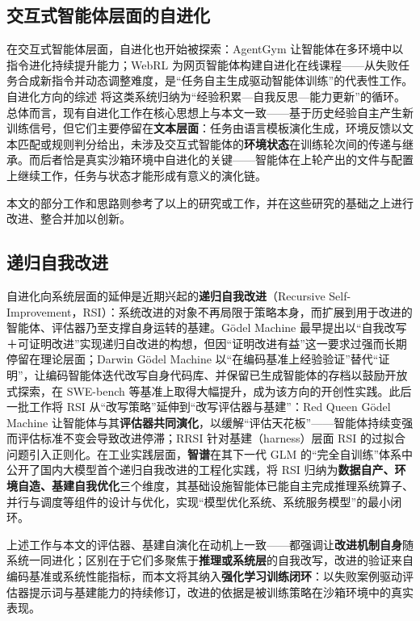\subsection{交互式智能体层面的自进化}

在交互式智能体层面，自进化也开始被探索：AgentGym 让智能体在多环境中以指令进化持续提升能力；WebRL 为网页智能体构建自进化在线课程——从失败任务合成新指令并动态调整难度，是“任务自主生成驱动智能体训练”的代表性工作。自进化方向的综述 将这类系统归纳为“经验积累—自我反思—能力更新”的循环。总体而言，现有自进化工作在核心思想上与本文一致——基于历史经验自主产生新训练信号，但它们主要停留在\textbf{文本层面}：任务由语言模板演化生成，环境反馈以文本匹配或规则判分给出，未涉及交互式智能体的\textbf{环境状态}在训练轮次间的传递与继承。而后者恰是真实沙箱环境中自进化的关键——智能体在上轮产出的文件与配置上继续工作，任务与状态才能形成有意义的演化链。

本文的部分工作和思路则参考了以上的研究或工作，并在这些研究的基础之上进行改进、整合并加以创新。

\subsection{递归自我改进}

自进化向系统层面的延伸是近期兴起的\textbf{递归自我改进}（Recursive Self-Improvement，RSI）：系统改进的对象不再局限于策略本身，而扩展到用于改进的智能体、评估器乃至支撑自身运转的基建。Gödel Machine 最早提出以“自我改写＋可证明改进”实现递归自改进的构想，但因“证明改进有益”这一要求过强而长期停留在理论层面；Darwin Gödel Machine 以“在编码基准上经验验证”替代“证明”，让编码智能体迭代改写自身代码库、并保留已生成智能体的存档以鼓励开放式探索，在 SWE-bench 等基准上取得大幅提升，成为该方向的开创性实践。此后一批工作将 RSI 从“改写策略”延伸到“改写评估器与基建”：Red Queen Gödel Machine 让智能体与其\textbf{评估器共同演化}，以缓解“评估天花板”——智能体持续变强而评估标准不变会导致改进停滞；RRSI 针对基建（harness）层面 RSI 的过拟合问题引入正则化。在工业实践层面，\textbf{智谱}在其下一代 GLM 的“完全自训练”体系中公开了国内大模型首个递归自我改进的工程化实践，将 RSI 归纳为\textbf{数据自产、环境自造、基建自我优化}三个维度，其基础设施智能体已能自主完成推理系统算子、并行与调度等组件的设计与优化，实现“模型优化系统、系统服务模型”的最小闭环。

上述工作与本文的评估器、基建自演化在动机上一致——都强调让\textbf{改进机制自身}随系统一同进化；区别在于它们多聚焦于\textbf{推理或系统层}的自我改写，改进的验证来自编码基准或系统性能指标，而本文将其纳入\textbf{强化学习训练闭环}：以失败案例驱动评估器提示词与基建能力的持续修订，改进的依据是被训练策略在沙箱环境中的真实表现。

